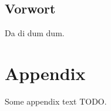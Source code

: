 





\pagestyle{preheadings}

\frontmatter

\maketitle

\setcounter{page}{1}



\tableofcontents


\newpage

\section*{Vorwort}

Da di dum dum.

\renewcommand{\thechapter}{\Roman{chapter}}
\renewcommand{\thesection}{\arabic{section}}


\mainmatter

\pagestyle{headings}








\renewcommand{\thechapter}{\Alph{chapter}}
\appendix%


\chapter{Appendix}

Some appendix text TODO.


\newpage

\listoftables

